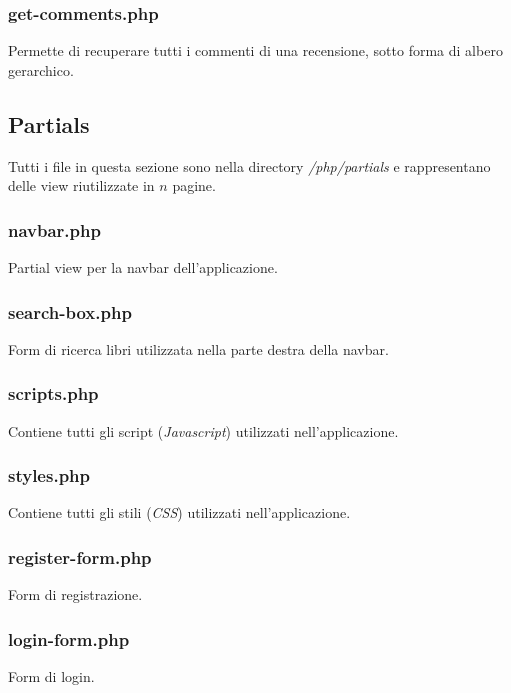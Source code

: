 \documentclass[italian]{article}
\begin{document}
\subsubsection{get-comments.php}
Permette di recuperare tutti i commenti di una recensione, sotto forma di albero gerarchico.


\subsection{Partials}
Tutti i file in questa sezione sono nella directory \textit{/php/partials} e rappresentano delle view riutilizzate in $n$ pagine.

\subsubsection{navbar.php}
Partial view per la navbar dell'applicazione.


\subsubsection{search-box.php}
Form di ricerca libri utilizzata nella parte destra della navbar.


\subsubsection{scripts.php}
Contiene tutti gli script (\textit{Javascript}) utilizzati nell'applicazione.


\subsubsection{styles.php}
Contiene tutti gli stili (\textit{CSS}) utilizzati nell'applicazione.


\subsubsection{register-form.php}
Form di registrazione.


\subsubsection{login-form.php}
Form di login.

\end{document}
